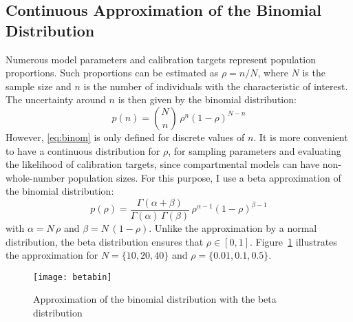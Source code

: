 \subsection{Continuous Approximation of the Binomial Distribution}\label{app.model.math.binom}
Numerous model parameters and calibration targets represent population proportions.
Such proportions can be estimated as $\rho = n / N$, where
$N$ is the sample size and $n$ is the number of individuals with the characteristic of interest.
The uncertainty around $n$ is then given by the binomial distribution:
\begin{equation}\label{eq:binom}
  p(n) = {N \choose n} \, \rho^{n}{(1 - \rho)}^{N - n}
\end{equation}
However, \eqref{eq:binom} is only defined for discrete values of $n$.
It is more convenient to have a continuous distribution for $\rho$,
for sampling parameters and evaluating the likelihood of calibration targets,
since compartmental models can have non-whole-number population sizes.
For this purpose, I use a beta approximation of the binomial distribution:
\begin{equation}\label{eq:beta}
  p(\rho) =
    \frac{\Gamma(\alpha+\beta)}{\Gamma(\alpha)\,\Gamma(\beta)}\,
    \rho^{\alpha-1}{(1 - \rho)}^{\beta-1}
\end{equation}
with $\alpha = N\,\rho$ and $\beta = N\,(1-\rho)$.
Unlike the approximation by a normal distribution,
the beta distribution ensures that $\rho \in [0,1]$.
Figure~\ref{fig:betabin} illustrates the approximation for
$N = \{10,20,40\}$ and $\rho = \{0.01,0.1,0.5\}$.
\begin{figure}
  \centering
  \texttt{[image: betabin]}
  \caption{Approximation of the binomial distribution
    with the beta distribution}
  \label{fig:betabin}
\end{figure}
